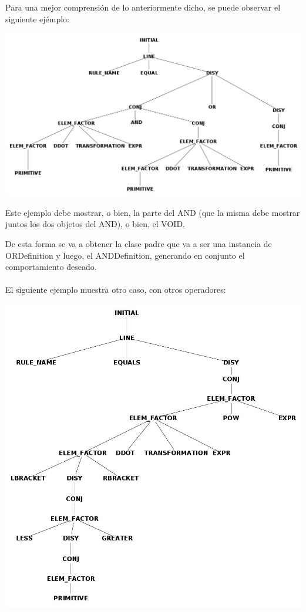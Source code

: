 Para una mejor comprensi\'on de lo anteriormente dicho, se puede observar el siguiente ej\'emplo:

%

\centerline{\includegraphics[scale=0.40]{arboles_derivacion/Ejemplo_and_or1.jpg}}

Este ejemplo debe mostrar, o bien, la parte del AND  (que la misma debe mostrar juntos los dos objetos del AND), o bien, el VOID.

De esta forma se va a obtener la clase padre que va a ser una instancia de ORDefinition y luego, el ANDDefinition, generando en conjunto el comportamiento deseado.
\\
\\
El siguiente ejemplo muestra otro caso, con otros operadores:



\centerline{\includegraphics[scale=0.40]{arboles_derivacion/brackets_less_greater1.jpg}}

